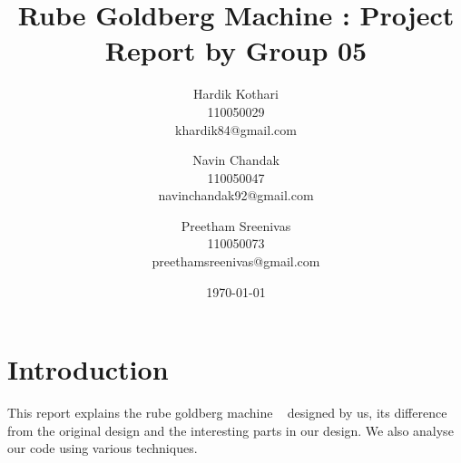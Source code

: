 \documentclass[english]{article}
\begin{document}
\title{Rube Goldberg Machine : Project Report by Group 05}
\author{Hardik Kothari\\
	110050029\\
	khardik84@gmail.com
	\and
	Navin Chandak\\
	110050047\\
	navinchandak92@gmail.com
	\and
	Preetham Sreenivas\\
	110050073\\
	preethamsreenivas@gmail.com
}
\date{\today}
\maketitle

\section{Introduction}
This report explains the rube goldberg machine ~\cite{wiki} designed by us, its difference from the original design and the interesting parts in our design. We also analyse our code using various techniques. 
\end{document}
